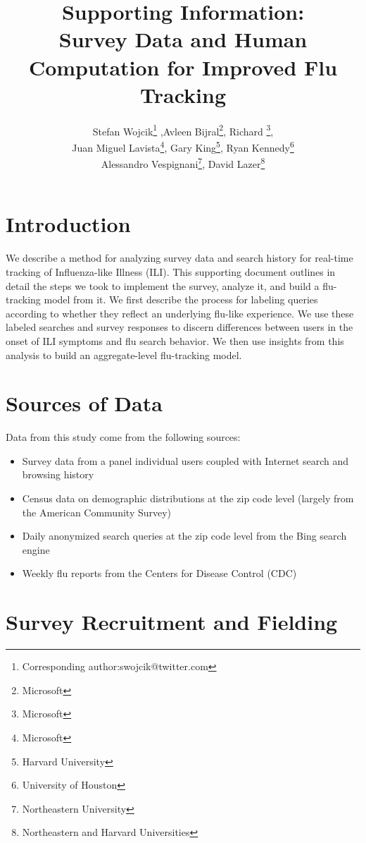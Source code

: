 \documentclass[12pt]{article}
\title{Supporting Information: \\ Survey Data and Human Computation for Improved Flu Tracking}
\author{Stefan Wojcik\footnote{Corresponding author:swojcik@twitter.com}
,Avleen Bijral\footnote{Microsoft},
Richard \DIFdelbegin \DIFdel{Johnson}\DIFdelend \DIFaddbegin \DIFadd{Johnston}\DIFaddend \footnote{Microsoft},\\
Juan Miguel Lavista\footnote{Microsoft},
Gary King\footnote{Harvard University},
Ryan Kennedy\footnote{University of Houston}\\
Alessandro Vespignani\footnote{Northeastern University},
David Lazer\footnote{Northeastern and Harvard Universities}}
\begin{document}
\maketitle

\clearpage

\tableofcontents

\clearpage

\singlespacing

\newpage

\section{Introduction}

We describe a method for analyzing survey data and search history for real-time tracking of Influenza-like Illness (ILI). This supporting document outlines in detail the steps we took to implement the survey, analyze it, and build a flu-tracking model from it. We first describe the process for labeling queries according to whether they reflect an underlying flu-like experience. We use these labeled searches and survey responses to discern differences between users in the onset of ILI symptoms and flu search behavior. We then use insights from this analysis to build an aggregate-level flu-tracking model.

\section{Sources of Data}
Data from this study come from the following sources:
\begin{itemize}
\item Survey data from a panel individual users coupled with Internet search and browsing history
\item Census data on demographic distributions at the zip code level (largely from the American Community Survey)
\item Daily anonymized search queries at the zip code level from the Bing search engine
\item Weekly flu reports from the Centers for Disease Control (CDC)
\end{itemize}

\section{Survey Recruitment and Fielding}
\end{document}
